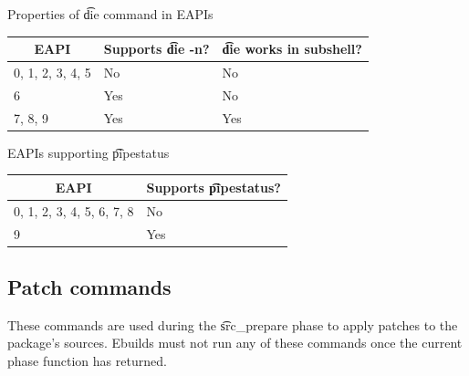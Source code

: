 \begin{centertable}{Properties of \t{die} command in EAPIs}
    \label{tab:die-properties}
    \begin{tabular}{lll}
      \toprule
      \multicolumn{1}{c}{\textbf{EAPI}} &
      \multicolumn{1}{c}{\textbf{Supports \t{die -n}?}} &
      \multicolumn{1}{c}{\textbf{\t{die} works in subshell?}} \\
      \midrule
      0, 1, 2, 3, 4, 5  & No  & No  \\
      6                 & Yes & No  \\
      7, 8, 9           & Yes & Yes \\
      \bottomrule
    \end{tabular}
\end{centertable}

\begin{centertable}{EAPIs supporting \t{pipestatus}}
    \label{tab:pipestatus}
    \begin{tabular}{ll}
      \toprule
      \multicolumn{1}{c}{\textbf{EAPI}} &
      \multicolumn{1}{c}{\textbf{Supports \t{pipestatus}?}} \\
      \midrule
      0, 1, 2, 3, 4, 5, 6, 7, 8 & No  \\
      9                         & Yes \\
      \bottomrule
    \end{tabular}
\end{centertable}

\subsection{Patch commands}
These commands are used during the \t{src_prepare} phase to apply patches to the package's sources.
Ebuilds must not run any of these commands once the current phase function has returned.

